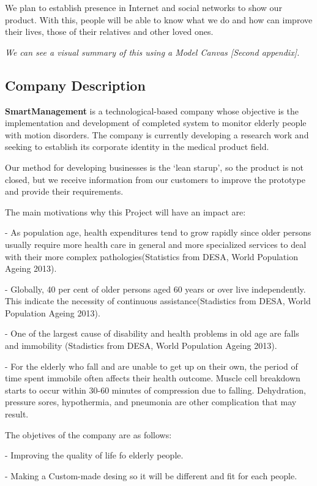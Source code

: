 We plan to establish presence in Internet and social networks to show our product. With this, people will be able to know what we do and how can improve their lives, those of their relatives and other loved ones.

\textit{We can see a visual summary of this using a Model Canvas [Second appendix].}
\vfill
\subsection{Company Description}
\textbf{SmartManagement} is a technological-based company whose objective is the implementation and development of completed system to monitor elderly people with motion disorders. The company is currently developing a research work and seeking to establish its corporate identity in the medical product field.

Our method for developing businesses is the ‘lean starup’, so the product is not closed, but we receive information from our customers to improve the prototype and provide their requirements.

The main motivations why this Project will have an impact are:

-	As population age, health expenditures tend to grow rapidly since older persons usually require more health care in general and more specialized services to deal with their more complex pathologies(Statistics from DESA,  World Population Ageing 2013\cite{desa}).

-	Globally, 40 per cent of older persons aged 60 years or over live independently. This indicate the necessity of continuous assistance(Stadistics from DESA,  World Population Ageing 2013\cite{desa}).

-	One of the largest cause of disability and health problems in old age are falls and immobility (Stadistics from DESA,  World Population Ageing 2013\cite{desa}).

-	For the elderly who fall and are unable to get up on their own, the period of time spent immobile often affects their health outcome. Muscle cell breakdown starts to occur within 30-60 minutes of compression due to falling. Dehydration, pressure sores, hypothermia, and pneumonia are other complication that may result\cite{A.Olivares2013}.

The objetives of the company are as follows:

-	Improving the quality of life fo elderly people.

-	Making a Custom-made desing so it will be different and fit for each people.

